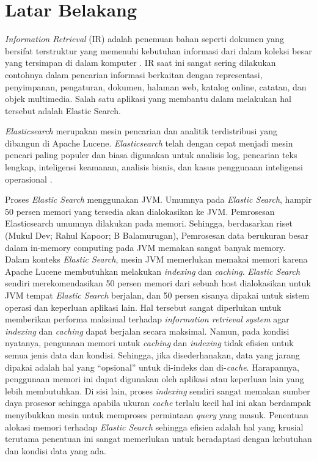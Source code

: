 \section{Latar Belakang}

\textit{Information Retrieval} (IR) adalah penemuan bahan seperti dokumen yang bersifat terstruktur yang memenuhi kebutuhan informasi dari dalam koleksi besar yang tersimpan di dalam komputer \parencite{inforetrieval}. IR saat ini sangat sering dilakukan contohnya dalam pencarian informasi berkaitan dengan representasi, penyimpanan, pengaturan, dokumen, halaman web, katalog online, catatan, dan objek multimedia. Salah satu aplikasi yang membantu dalam melakukan hal tersebut adalah Elastic Search.

\textit{Elasticsearch} merupakan mesin pencarian dan analitik terdistribusi yang dibangun di Apache Lucene. \textit{Elasticsearch} telah dengan cepat menjadi mesin pencari paling populer dan biasa digunakan untuk analisis log, pencarian teks lengkap, inteligensi keamanan, analisis bisnis, dan kasus penggunaan inteligensi operasional \parencite{elasticsearch}.

Proses \textit{Elastic Search} menggunakan JVM. Umumnya pada \textit{Elastic Search}, hampir 50 persen memori yang tersedia akan dialokasikan ke JVM. Pemrosesan Elasticsearch umumnya dilakukan pada memori. Sehingga, berdasarkan riset (Mukul Dev; Rahul Kapoor; B Balamurugan), Pemrosesan data berukuran besar dalam in-memory computing pada JVM memakan sangat banyak memory. Dalam konteks \textit{Elastic Search}, mesin JVM memerlukan memakai memori karena Apache Lucene membutuhkan melakukan \textit{indexing} dan \textit{caching}. \textit{Elastic Search} sendiri merekomendasikan 50 persen memori dari sebuah host dialokasikan untuk JVM tempat \textit{Elastic Search} berjalan, dan 50 persen sisanya dipakai untuk sistem operasi dan keperluan aplikasi lain. Hal tersebut sangat diperlukan untuk memberikan performa maksimal terhadap \textit{information retrieval system} agar \textit{indexing} dan \textit{caching} dapat berjalan secara maksimal. Namun, pada kondisi nyatanya, pengunaan memori untuk \textit{caching} dan \textit{indexing} tidak efisien untuk semua jenis data dan kondisi. Sehingga, jika disederhanakan, data yang jarang dipakai adalah hal yang “opsional” untuk di-indeks dan di-\textit{cache}. Harapannya, penggunaan memori ini dapat digunakan oleh aplikasi atau keperluan lain yang lebih membutuhkan. Di sisi lain, proses \textit{indexing} sendiri sangat memakan sumber daya prosesor sehingga apabila ukuran \textit{cache} terlalu kecil hal ini akan berdampak menyibukkan mesin untuk memproses permintaan \textit{query} yang masuk. Penentuan alokasi memori terhadap \textit{Elastic Search} sehingga efisien adalah hal yang krusial terutama penentuan ini sangat memerlukan untuk beradaptasi dengan kebutuhan dan kondisi data yang ada.



